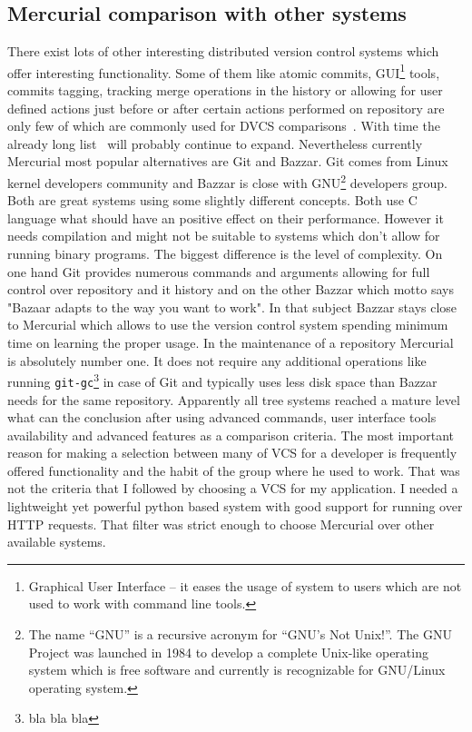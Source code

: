\subsection{Mercurial comparison with other systems}\label{subsec:dvcs_compare}
There exist lots of other interesting distributed version control systems which offer interesting functionality. Some of them like atomic commits, GUI\footnote{Graphical User Interface -- it eases the usage of system to users which are not used to work with command line tools.} tools, commits tagging, tracking merge operations in the history or allowing for user defined actions just before or after certain actions performed on repository are only few of which are commonly used for DVCS comparisons~\cite{wiki_dvcs_compare}. With time the already long list~\cite{wiki_dvcs_list} will probably continue to expand. Nevertheless currently Mercurial most popular alternatives are Git and Bazzar. Git comes from Linux kernel developers community and Bazzar is close with GNU\footnote{The name “GNU” is a recursive acronym for “GNU's Not Unix!”. The GNU Project was launched in 1984 to develop a complete Unix-like operating system which is free software and currently is recognizable for GNU/Linux operating system.} developers group. Both are great systems using some slightly different concepts. Both use C language what should have an positive effect on their performance. However it needs compilation and might not be suitable to systems which don't allow for running binary programs. The biggest difference is the level of complexity. On one hand Git provides numerous commands and arguments allowing for full control over repository and it history and on the other Bazzar which motto says "Bazaar adapts to the way you want to work". In that subject Bazzar stays close to Mercurial which allows to use the version control system spending minimum time on learning the proper usage. In the maintenance of a repository Mercurial is absolutely number one. It does not require any additional operations like running \texttt{git-gc}\footnote{bla bla bla} in case of Git and typically uses less disk space than Bazzar needs for the same repository. Apparently all tree systems reached a mature level what can the conclusion after using advanced commands, user interface tools availability and  advanced features as a comparison criteria. The most important reason for making a selection between many of VCS for a developer is frequently offered functionality and the habit of the group where he used to work. That was not the criteria that I followed by choosing a VCS for my application. I needed a lightweight yet powerful python based system with good support for running over HTTP requests. That filter was strict enough to choose Mercurial over other available systems.     

